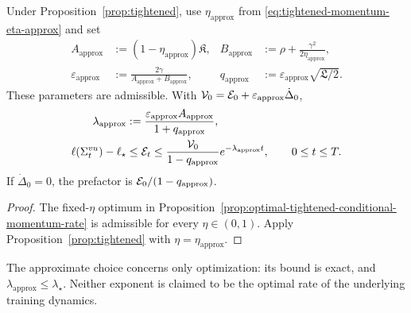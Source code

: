 \begin{corollary}
\label{cor:explicit-tightened-conditional-momentum-rate}\label{cor:tightened-choices}
Under Proposition~\ref{prop:tightened}, use
$\eta_{\mathrm{approx}}$ from \eqref{eq:tightened-momentum-eta-approx} and set
\begin{align}
 A_{\mathrm{approx}}&:=(1-\eta_{\mathrm{approx}})\mathfrak K,&
 B_{\mathrm{approx}}&:=\rho+\frac{\gamma^2}{2\eta_{\mathrm{approx}}},\label{eq:tightened-momentum-explicit-A-B}\\
 \varepsilon_{\mathrm{approx}}&:=\frac{2\gamma}{A_{\mathrm{approx}}+B_{\mathrm{approx}}},&
 q_{\mathrm{approx}}&:=\varepsilon_{\mathrm{approx}}\sqrt{\mathfrak L/2}.\label{eq:tightened-momentum-explicit-epsilon-q}
\end{align}
These parameters are admissible. With
$\mathcal V_0=\mathcal E_0+\varepsilon_{\mathrm{approx}}\dot\Delta_0$,
\begin{align}
 \lambda_{\mathrm{approx}}
 &:=\frac{\varepsilon_{\mathrm{approx}}A_{\mathrm{approx}}}
         {1+q_{\mathrm{approx}}},\label{eq:tightened-momentum-explicit-rate}\\
 \ell(\Sigma^{vu}_t)-\ell_\star
 &\le\mathcal E_t\le\frac{\mathcal V_0}{1-q_{\mathrm{approx}}}
       e^{-\lambda_{\mathrm{approx}}t},\qquad 0\le t\le T.\label{eq:tightened-momentum-explicit-loss-rate}
\end{align}
If $\dot\Delta_0=0$, the prefactor is $\mathcal E_0/(1-q_{\mathrm{approx}})$.
\end{corollary}

\begin{proof}
The fixed-$\eta$ optimum in
Proposition~\ref{prop:optimal-tightened-conditional-momentum-rate}
is admissible for every $\eta\in(0,1)$.
Apply Proposition~\ref{prop:tightened} with $\eta=\eta_{\mathrm{approx}}$.
\end{proof}

The approximate choice concerns only optimization: its bound is exact,
and $\lambda_{\mathrm{approx}}\le\lambda_\star$. Neither exponent is
claimed to be the optimal rate of the underlying training dynamics.

